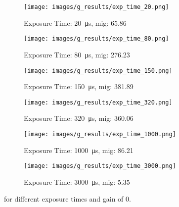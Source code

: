\begin{figure}[h]
    \centering
    \begin{subfigure}[b]{0.4\textwidth}
        \centering
        \texttt{[image: images/g\_results/exp\_time\_20.png]}
        \caption{Exposure Time: \SI{20}{\micro\second}, \gls{mig}: 65.86}
        \label{subfig:underexposed.png}
    \end{subfigure}
    \hspace{1cm}
    \begin{subfigure}[b]{0.4\textwidth}
        \centering
        \texttt{[image: images/g\_results/exp\_time\_80.png]}
        \caption{Exposure Time: \SI{80}{\micro\second}, \gls{mig}: 276.23}
        \label{subfig:underexposed.png}
    \end{subfigure}

    \vspace{5mm}
    
    \begin{subfigure}[b]{0.4\textwidth}
        \centering
        \texttt{[image: images/g\_results/exp\_time\_150.png]}
        \caption{Exposure Time: \SI{150}{\micro\second}, \gls{mig}: 381.89}
        \label{subfig:underexposed.png}
    \end{subfigure}
    \hspace{1cm}
    \begin{subfigure}[b]{0.4\textwidth}
        \centering
        \texttt{[image: images/g\_results/exp\_time\_320.png]}
        \caption{Exposure Time: \SI{320}{\micro\second}, \gls{mig}: 360.06}
        \label{subfig:underexposed.png}
    \end{subfigure}

    \vspace{5mm}
    
    \begin{subfigure}[b]{0.4\textwidth}
        \centering
        \texttt{[image: images/g\_results/exp\_time\_1000.png]}
        \caption{Exposure Time: \SI{1000}{\micro\second}, \gls{mig}: 86.21}
        \label{subfig:underexposed.png}
    \end{subfigure}
    \hspace{1cm}
    \begin{subfigure}[b]{0.4\textwidth}
        \centering
        \texttt{[image: images/g\_results/exp\_time\_3000.png]}
        \caption{Exposure Time: \SI{3000}{\micro\second}, \gls{mig}: 5.35}
        \label{subfig:underexposed.png}
    \end{subfigure}
    \caption{ for different exposure times and gain of 0.}
    \label{fig:example_images_exposure_time}
\end{figure}

